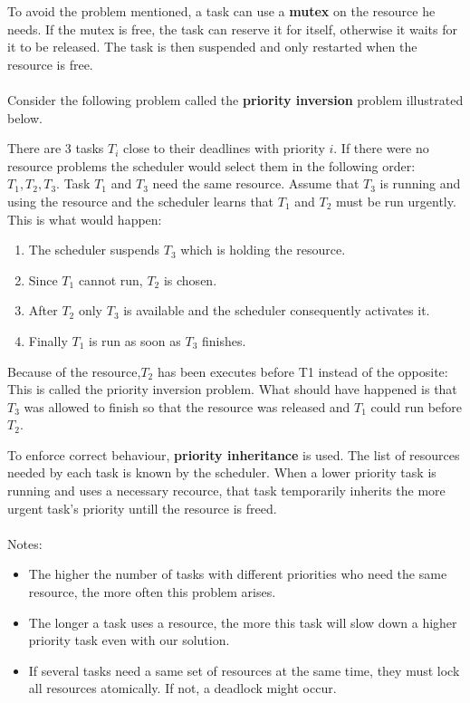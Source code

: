 \documentclass[../main.tex]{subfiles}
\begin{document}
To avoid the problem mentioned, a task can use a \textbf{mutex} on the resource he needs. If the mutex is free, the task can reserve it for itself, otherwise it waits for it to be released. The task is then suspended and only restarted when the resource is free.
\\\\
Consider the following problem called the \textbf{priority inversion} problem illustrated below.
\begin{exmp}
There are 3 tasks $T_i$ close to their deadlines with priority $i$. If there were no resource problems the scheduler would select them in the following order: $T_1, T_2, T_3$. Task $T_1$ and $T_3$ need the same resource. Assume that $T_3$ is running and using the resource and the scheduler learns that $T_1$ and $T_2$ must be run urgently. This is what would happen:
\begin{enumerate}
	\item The scheduler suspends $T_3$ which is holding the resource.
	\item Since $T_1$ cannot run, $T_2$ is chosen.
	\item After $T_2$ only $T_3$ is available and the scheduler consequently activates it.
	\item Finally $T_1$ is run as soon as $T_3$ finishes.
\end{enumerate} 
Because of the resource,$T_2$ has been executes before T1 instead of the opposite: This is called the priority inversion problem. What should have happened is that $T_3$ was allowed to finish so that the resource was released and $T_1$ could run before $T_2$.
\end{exmp}
To enforce correct behaviour, \textbf{priority inheritance} is used. The list of resources needed by each task is known by the scheduler. When a lower priority task is running and uses a necessary recource, that task temporarily inherits the more urgent task's priority untill the resource is freed.
\\\\
Notes:
\begin{itemize}
	\item The higher the number of tasks with different priorities who need the same resource, the more often this problem arises. 
	\item The longer a task uses a resource, the more this task will slow down a higher priority task even with our solution.
	\item If several tasks need a same set of resources at the same time, they must lock all resources atomically. If not, a deadlock might occur.
\end{itemize}
\end{document}

